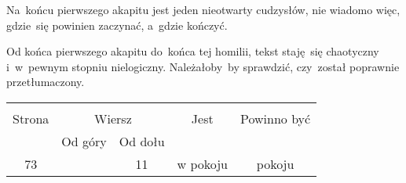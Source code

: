 \documentclass[a4paper,11pt]{article}
\begin{document}






\vspace{\spaceTwo} \vspace{\spaceThree}






\start {} Na~końcu pierwszego akapitu jest jeden nieotwarty
cudzysłów, nie wiadomo więc, gdzie~się powinien zaczynać, a~gdzie
kończyć.

\vspace{\spaceFour}


\start {} Od końca pierwszego akapitu do~końca tej homilii,
tekst staję~się chaotyczny i~w~pewnym stopniu nielogiczny.
Należałoby~by sprawdzić, czy~został poprawnie przetłumaczony.


\begin{center}
  \begin{tabular}{|c|c|c|c|c|}
    \hline
    & \multicolumn{2}{c|}{} & & \\
    Strona & \multicolumn{2}{c|}{Wiersz} & Jest
                              & Powinno być \\ \cline{2-3}
    & Od góry & Od dołu & & \\
    \hline
    73 & & 11 & w pokoju & pokoju \\
    \hline
  \end{tabular}
\end{center}

\vspace{\spaceTwo}







\end{document}
